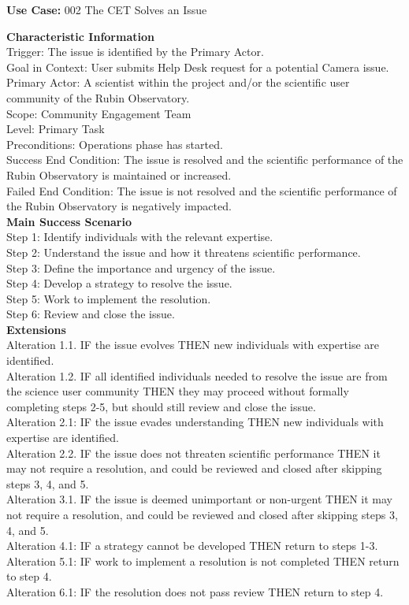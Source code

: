 {\bf Use Case:} 002 The CET Solves an Issue

{\bf Characteristic Information} \\
Trigger: The issue is identified by the Primary Actor. \\
Goal in Context: User submits Help Desk request for a potential Camera issue. \\
Primary Actor: A scientist within the project and/or the scientific user community of the Rubin Observatory. \\
Scope: Community Engagement Team \\
Level: Primary Task \\
Preconditions: Operations phase has started. \\
Success End Condition: The issue is resolved and the scientific performance of the Rubin Observatory is maintained or increased. \\
Failed End Condition: The issue is not resolved and the scientific performance of the Rubin Observatory is negatively impacted. \\

{\bf Main Success Scenario} \\
Step 1: Identify individuals with the relevant expertise.\\
Step 2: Understand the issue and how it threatens scientific performance.\\
Step 3: Define the importance and urgency of the issue.\\
Step 4: Develop a strategy to resolve the issue.\\
Step 5: Work to implement the resolution.\\
Step 6: Review and close the issue.\\

{\bf Extensions} \\
Alteration 1.1. IF  the issue evolves THEN new individuals with expertise are identified.\\
Alteration 1.2. IF  all identified individuals needed to resolve the issue are from the science user community THEN they may proceed without formally completing steps 2-5, but should still review and close the issue.\\
Alteration 2.1: IF the issue evades understanding THEN new individuals with expertise are identified.\\
Alteration 2.2. IF the issue does not threaten scientific performance THEN it may not require a resolution, and could be reviewed and closed after skipping steps 3, 4, and 5.\\
Alteration 3.1. IF the issue is deemed unimportant or non-urgent THEN it may not require a resolution, and could be reviewed and closed after skipping steps 3, 4, and 5.\\
Alteration 4.1: IF a strategy cannot be developed THEN return to steps 1-3.\\
Alteration 5.1: IF work to implement a resolution is not completed THEN return to step 4.\\
Alteration 6.1: IF the resolution does not pass review THEN return to step 4.\\

